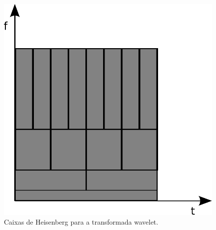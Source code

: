 \begin{frame}[allowframebreaks]
\begin{columns}[c]
  \begin{figure}[hptb]
  \centering
  \includegraphics[width=.7\textwidth]{images/heisenber_boxes_wavelet.pdf}
  \caption{Caixas de Heisenberg para a transformada wavelet.}
  \label{fig:caixas_tempo-freq_wavelet}
  \end{figure}
  \end{columns} 
\end{frame}

